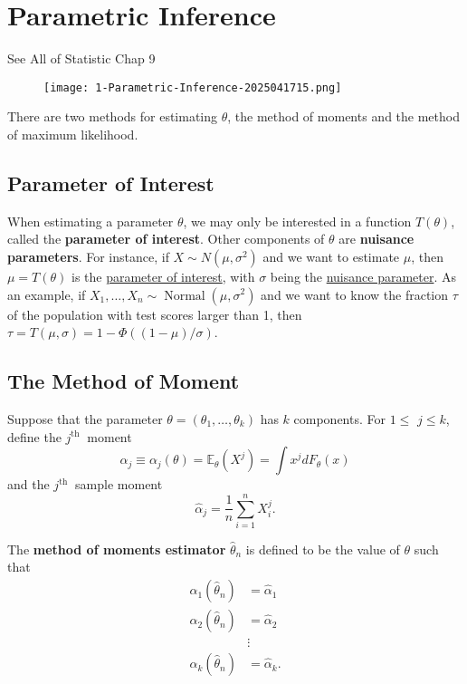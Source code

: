 \section{Parametric Inference}

See All of Statistic Chap 9

\begin{figure}[H]
\centering
\texttt{[image: 1-Parametric-Inference-2025041715.png]}
\label{}
\end{figure}
There are two methods for estimating $\theta$, the method of moments and the method of maximum likelihood.

\subsection{Parameter of Interest}

When estimating a parameter $\theta$, we may only be interested in a function $T(\theta)$, called the \textbf{parameter of interest}. Other components of $\theta$ are \textbf{nuisance parameters}. For instance, if $X \sim N(\mu, \sigma^2)$ and we want to estimate $\mu$, then $\mu = T(\theta)$ is the \underline{parameter of interest}, with $\sigma$ being the \underline{nuisance parameter}. As an example, if $X_1, \ldots, X_n \sim \operatorname{Normal}(\mu, \sigma^2)$ and we want to know the fraction $\tau$ of the population with test scores larger than 1, then $\tau = T(\mu, \sigma) = 1 - \Phi((1-\mu) / \sigma)$.

\subsection{The Method of Moment}

Suppose that the parameter $\theta=\left(\theta_1, \ldots, \theta_k\right)$ has $k$ components. For $1 \leq$ $j \leq k$, define the $j^{\text {th }}$ moment
\[
\alpha_j \equiv \alpha_j(\theta)=\mathbb{E}_\theta\left(X^j\right)=\int x^j d F_\theta(x)
\]
and the $j^{\text {th }}$ sample moment
\[
\widehat{\alpha}_j=\frac{1}{n} \sum_{i=1}^n X_i^j .
\]
\begin{definition}
The \textbf{method of moments estimator} $\widehat{\theta}_n$ is defined to be the value of $\theta$ such that
\begin{equation}
\begin{aligned}
\alpha_1\left(\widehat{\theta}_n\right) & =\widehat{\alpha}_1 \\
\alpha_2\left(\widehat{\theta}_n\right) & =\widehat{\alpha}_2 \\
 &\vdots \\
\alpha_k\left(\widehat{\theta}_n\right) & =\widehat{\alpha}_k .
\end{aligned}
\label{2f0756}
\end{equation}
\end{definition}

